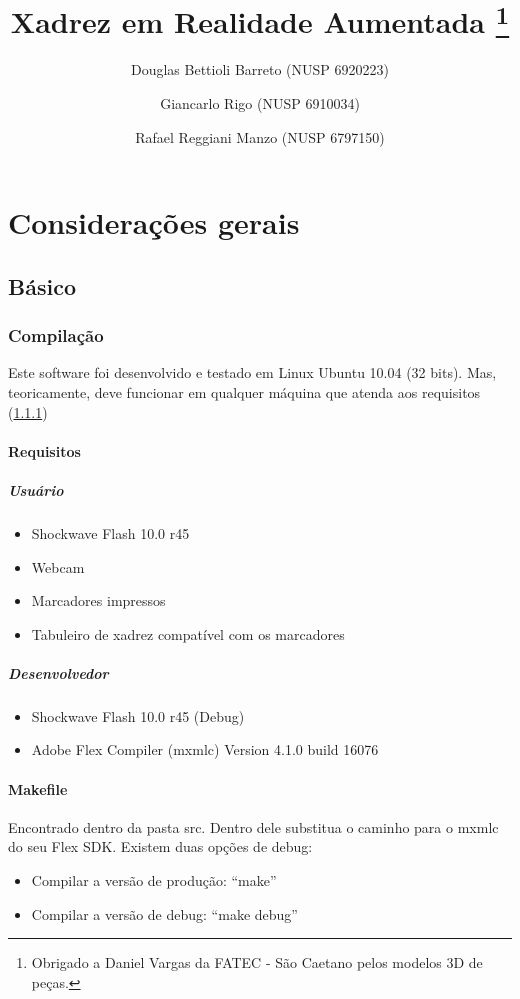 \documentclass[a4paper,12pt]{book}
\title{Xadrez em Realidade Aumentada \thanks{Obrigado a Daniel Vargas da FATEC - S\~ao Caetano pelos modelos 3D de pe\c cas.}}
\author{
		Douglas Bettioli Barreto (NUSP 6920223)
		\and Giancarlo Rigo (NUSP 6910034)
		\and Rafael Reggiani Manzo (NUSP 6797150)
	   }
\begin{document}
\maketitle

\part{Considera\c c\~oes gerais}
\label{part:consideracoesgerais}
  \chapter{B\'asico}
  \label{chbasico}
  \section{Compila\c c\~ao}
	\label{sec:cgcompilacao}
	Este software foi desenvolvido e testado em Linux Ubuntu 10.04 (32 bits). Mas,
	teoricamente, deve funcionar em qualquer m\'aquina que atenda aos requisitos
	(\ref{subsec:cgrequisitos})
	
	\subsection{Requisitos}
	\label{subsec:cgrequisitos}
    \subsubsection{Usu\'ario}
    \label{subsubsec:requsuario}
    \begin{itemize}
      \item{Shockwave Flash 10.0 r45}
      \item{Webcam}
      \item{Marcadores impressos}
      \item{Tabuleiro de xadrez compat\'ivel com os marcadores}
    \end{itemize}
  
    \subsubsection{Desenvolvedor}
    \label{subsubsec:reqdesenvolvedor}
	  \begin{itemize}
      \item{Shockwave Flash 10.0 r45 (Debug)}
		  \item{Adobe Flex Compiler (mxmlc) Version 4.1.0 build 16076}
	  \end{itemize}
	
	\subsection{Makefile}
	Encontrado dentro da pasta src. Dentro dele substitua o caminho para o mxmlc do
	seu Flex SDK.
	Existem duas op\c c\~oes de debug:
	\begin{itemize}
	  \item{Compilar a vers\~ao de produ\c c\~ao: ``make''}
	  \item{Compilar a vers\~ao de debug: ``make debug''}
	\end{itemize}
\end{document}
